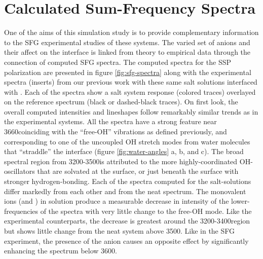 \section{Calculated Sum-Frequency Spectra}

One of the aims of this simulation study is to provide complementary information to the SFG experimental studies of these systems.\cite{McFearin2009} The varied set of anions and their affect on the \ctcwat interface is linked from theory to empirical data through the connection of computed SFG spectra. The computed spectra for the SSP polarization are presented in figure \ref{fig:sfg-spectra} along with the experimental spectra (inserts) from our previous work with these same salt solutions interfaced with \ctc.\cite{McFearin2009} Each of the spectra show a salt system response (colored traces) overlayed on the reference \ctcwat spectrum (black or dashed-black traces). On first look, the overall computed intensities and lineshapes follow remarkably similar trends as in the experimental systems. All the spectra have a strong feature near 3660\cm coinciding with the ``free-OH'' vibrations as defined previously, and corresponding to one of the uncoupled OH stretch modes from water molecules that ``straddle'' the interface (figure \ref{fig:water-angles} a, b, and c).\cite{McFearin2009} The broad spectral region from 3200-3500\cm is attributed to the more highly-coordinated OH-oscillators that are solvated at the surface, or just beneath the surface with stronger hydrogen-bonding. Each of the spectra computed for the salt-solutions differ markedly from each other and from the neat \ctcwat spectrum. The monovalent ions (\cl and \nit) in solution produce a measurable decrease in intensity of the lower-frequencies of the spectra with very little change to the free-OH mode. Like the experimental counterparts, the decrease is greatest around the 3200-3400\cm region but shows little change from the neat \ctcwat system above 3500\cm. Like in the SFG experiment, the presence of the \sul anion causes an opposite effect by significantly enhancing the spectrum below 3600\cm.

